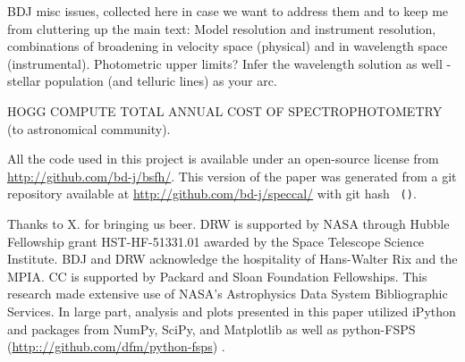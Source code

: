 \documentclass[iop,numberedappendix]{emulateapj}
\begin{document}
{\color{blue} BDJ misc issues, collected here in case we want to
address them and to keep me from cluttering up the main text:} Model
resolution and instrument resolution, combinations of broadening in
velocity space (physical) and in wavelength space (instrumental).
Photometric upper limits? Infer the wavelength solution as well -
stellar population (and telluric lines) as your arc.

HOGG COMPUTE TOTAL ANNUAL COST OF SPECTROPHOTOMETRY (to astronomical community).

All the code used in this project is available under an open-source license
  from \url{http://github.com/bd-j/bsfh/}.
This version of the paper was generated
  from a git repository available at \url{http://github.com/bd-j/speccal/}
  with git hash \texttt{\githash\,(\gitdate)}.

\acknowledgements
Thanks to X. for bringing us beer.
DRW is supported by NASA through Hubble Fellowship grant
  HST-HF-51331.01 awarded by the Space Telescope Science Institute.
BDJ and DRW acknowledge the hospitality of Hans-Walter Rix and the MPIA. 
CC is supported by Packard and Sloan Foundation Fellowships. 
This research made extensive use of NASA's Astrophysics Data System Bibliographic Services. 
In large part, analysis and plots presented in this paper utilized
  iPython and packages from NumPy, SciPy, and Matplotlib
  \citep[][]{hunter2007, oliphant2007, perez2007} as well
  as python-FSPS  (\url{http:://github.com/dfm/python-fsps}) .
\end{document}
